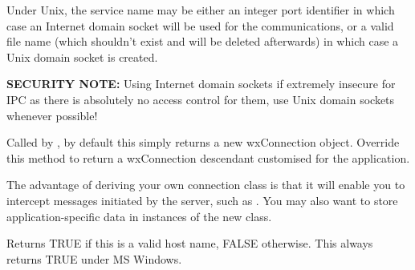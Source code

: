 Under Unix, the service name may be either an integer port
identifier in which case an Internet domain socket will be used
for the communications, or a valid file name (which shouldn't
exist and will be deleted afterwards) in which case a Unix domain
socket is created.

{\bf SECURITY NOTE:} Using Internet domain sockets if extremely
insecure for IPC as there is absolutely no access control for
them, use Unix domain sockets whenever possible!

\label{wxddeclientonmakeconnection}


Called by , by
default this simply returns a new wxConnection object. Override
this method to return a wxConnection descendant customised for the
application.

The advantage of deriving your own connection class is that it
will enable you to intercept messages initiated by the server,
such as . You
may also want to store application-specific data in instances of
the new class.



Returns TRUE if this is a valid host name, FALSE otherwise. This always
returns TRUE under MS Windows.

